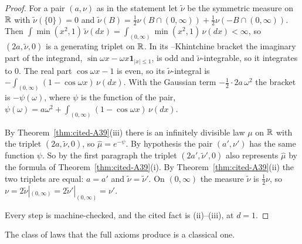 \begin{proof}
\leanok
{}
For a pair $(a, \nu)$ as in the statement let $\tilde\nu$ be the symmetric measure on $\mathbb{R}$ with
$\tilde\nu(\{0\}) = 0$ and $\tilde\nu(B) = \tfrac12\nu(B \cap (0,\infty)) +
\tfrac12\nu(-B \cap (0,\infty))$. Then $\int\min(x^2, 1)\,\tilde\nu(dx) =
\int_{(0,\infty)}\min(x^2, 1)\,\nu(dx) < \infty$, so $(2a, \tilde\nu, 0)$ is a generating triplet
on $\mathbb{R}$. In its \Levy--Khintchine bracket the imaginary part of the integrand,
$\sin\omega x - \omega x\mathbf 1_{|x| \le 1}$, is odd and $\tilde\nu$-integrable, so it integrates
to $0$. The real part $\cos\omega x - 1$ is even, so its $\tilde\nu$-integral is
$-\int_{(0,\infty)}(1 - \cos\omega x)\,\nu(dx)$. With the Gaussian term
$-\tfrac12\cdot 2a\,\omega^2$ the bracket is $-\psi(\omega)$, where $\psi$ is the function of the
pair, $\psi(\omega) = a\omega^2 + \int_{(0,\infty)}(1 - \cos\omega x)\,\nu(dx)$.

By Theorem~\ref{thm:cited-A39}(iii) there is an infinitely divisible law $\mu$ on $\mathbb{R}$ with the triplet
$(2a, \tilde\nu, 0)$, so $\widehat\mu = e^{-\psi}$. By hypothesis the pair $(a', \nu')$ has the
same function $\psi$. So by the first paragraph the triplet $(2a', \tilde\nu', 0)$ also represents
$\widehat\mu$ by the formula of Theorem~\ref{thm:cited-A39}(i). By Theorem~\ref{thm:cited-A39}(ii) the two triplets
are equal: $a = a'$ and $\tilde\nu = \tilde\nu'$. On $(0,\infty)$ the measure $\tilde\nu$ is
$\tfrac12\nu$, so $\nu = 2\tilde\nu|_{(0,\infty)} = 2\tilde\nu'|_{(0,\infty)} = \nu'$.

Every step is machine-checked, and the cited fact is (ii)--(iii), at $d = 1$.
\end{proof}

The class of laws that the full axioms produce is a classical one.

